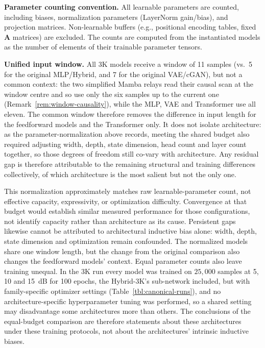 \textbf{Parameter counting convention.} All learnable parameters are counted, including biases, normalization parameters (LayerNorm gain/bias), and projection matrices. Non-learnable buffers (e.g., positional encoding tables, fixed \(\mathbf{A}\) matrices) are excluded. The counts are computed from the instantiated models as the number of elements of their trainable parameter tensors.

\textbf{Unified input window.} All 3K models receive a window of 11 samples (vs.~5 for the original MLP/Hybrid, and 7 for the original VAE/cGAN), but not a common context: the two simplified Mamba relays read their causal scan at the window centre and so use only the six samples up to the current one (Remark~\ref{rem:window-causality}), while the MLP, VAE and Transformer use all eleven. The common window therefore removes the difference in input length for the feedforward models and the Transformer only. It does not isolate architecture: as the parameter-normalization above records, meeting the shared budget also required adjusting width, depth, state dimension, head count and layer count together, so those degrees of freedom still co-vary with architecture. Any residual gap is therefore attributable to the remaining structural and training differences collectively, of which architecture is the most salient but not the only one.

This normalization approximately matches raw learnable-parameter count, not effective capacity, expressivity, or optimization difficulty. Convergence at that budget would establish similar measured performance for those configurations, not identify capacity rather than architecture as its cause. Persistent gaps likewise cannot be attributed to architectural inductive bias alone: width, depth, state dimension and optimization remain confounded. The normalized models share one window length, but the change from the original comparison also changes the feedforward models' context. Equal parameter counts also leave training unequal. In the 3K run every model was trained on $25{,}000$ samples at 5, 10 and 15~dB for 100 epochs, the Hybrid-3K's sub-network included, but with family-specific optimizer settings (Table~\ref{tbl:canonical-runs}), and no architecture-specific hyperparameter tuning was performed, so a shared setting may disadvantage some architectures more than others. The conclusions of the equal-budget comparison are therefore statements about these architectures under these training protocols, not about the architectures' intrinsic inductive biases.

